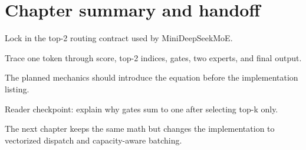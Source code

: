\section{Chapter summary and handoff}
\label{sec:ch05-chapter-summary-and-handoff}

Lock in the top-2 routing contract used by MiniDeepSeekMoE.



Trace one token through score, top-2 indices, gates, two experts, and final output.



The planned mechanics should introduce the equation before the implementation listing.





\begin{checkpointbox}
Reader checkpoint: explain why gates sum to one after selecting top-k only.
\end{checkpointbox}

The next chapter keeps the same math but changes the implementation to vectorized dispatch and capacity-aware batching.
